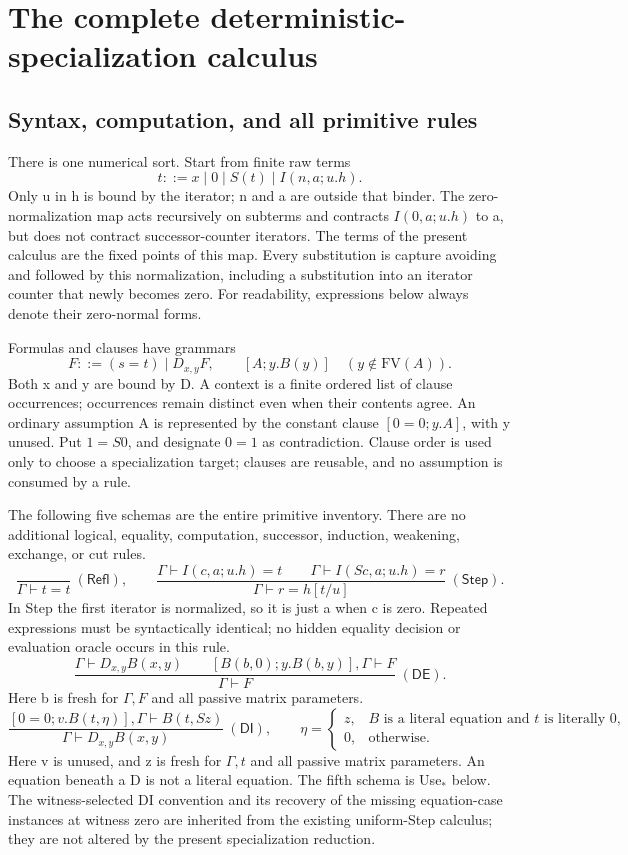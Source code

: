 \section{The complete deterministic-specialization calculus}
\label{sec:deterministic-specialization}

\subsection{Syntax, computation, and all primitive rules}

There is one numerical sort.  Start from finite raw terms
\[
 t ::= x\mid 0\mid S(t)\mid I(n,a;u.h).
\]
Only u in h is bound by the iterator; n and a are outside that binder.
The zero-normalization map acts recursively on subterms and contracts
\(I(0,a;u.h)\) to a, but does not contract successor-counter iterators.
The terms of the present calculus are the fixed points of this map.
Every substitution is capture avoiding and followed by this normalization,
including a substitution into an iterator counter that newly becomes zero.
For readability, expressions below always denote their zero-normal forms.

Formulas and clauses have grammars
\[
 F ::= (s=t)\mid D_{x,y}F,\qquad [A;y.B(y)]\quad(y\notin\mathrm{FV}(A)).
\]
Both x and y are bound by D.  A context is a finite ordered list of clause
occurrences; occurrences remain distinct even when their contents agree.
An ordinary assumption A is represented by the constant clause
\([0=0;y.A]\), with y unused.  Put \(1=S0\), and designate \(0=1\)
as contradiction.  Clause order is used only to choose a specialization
target; clauses are reusable, and no assumption is consumed by a rule.

The following five schemas are the entire primitive inventory.  There
are no additional logical, equality, computation, successor, induction,
weakening, exchange, or cut rules.
\[
 \frac{}{\Gamma\vdash t=t}\ (\mathsf{Refl}),\qquad
 \frac{\Gamma\vdash I(c,a;u.h)=t\qquad
       \Gamma\vdash I(Sc,a;u.h)=r}
      {\Gamma\vdash r=h[t/u]}\ (\mathsf{Step}).
\]
In Step the first iterator is normalized, so it is just a when c is zero.
Repeated expressions must be syntactically identical; no hidden equality
decision or evaluation oracle occurs in this rule.
\[
 \frac{\Gamma\vdash D_{x,y}B(x,y)\qquad
       [B(b,0);y.B(b,y)],\Gamma\vdash F}
      {\Gamma\vdash F}\ (\mathsf{DE}).
\]
Here b is fresh for \(\Gamma,F\) and all passive matrix parameters.
\[
 \frac{[0=0;v.B(t,\eta)],\Gamma\vdash B(t,Sz)}
      {\Gamma\vdash D_{x,y}B(x,y)}\ (\mathsf{DI}),\qquad
 \eta=\begin{cases}
 z,&B\text{ is a literal equation and }t\text{ is literally }0,\\
 0,&\text{otherwise}.
 \end{cases}
\]
Here v is unused, and z is fresh for \(\Gamma,t\) and all passive matrix
parameters.  An equation beneath a D is not a literal equation.  The
fifth schema is Use$_*$ below.  The witness-selected DI convention and
its recovery of the missing equation-case instances at witness zero are
inherited from the existing uniform-Step calculus; they are not altered
by the present specialization reduction.

